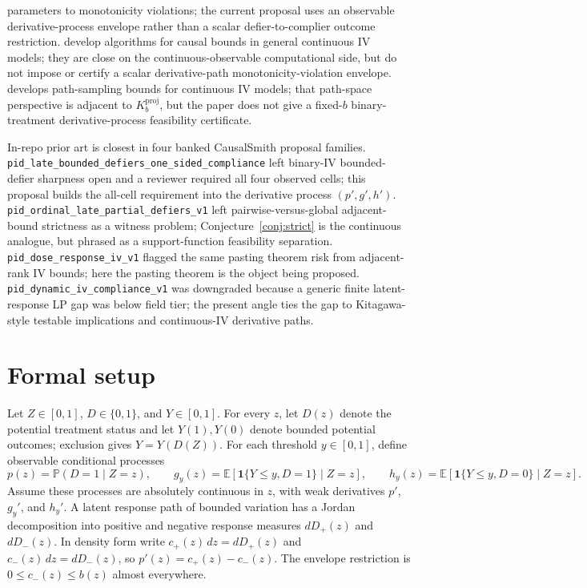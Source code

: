 \documentclass[11pt]{article}
\newcommand{\E}{\mathbb{E}}
\renewcommand{\Pr}{\mathbb{P}}
\newcommand{\one}{\mathbf{1}}
\theoremstyle{definition}
\theoremstyle{plain}
\theoremstyle{remark}
\begin{document}
parameters to monotonicity violations; the current proposal uses an observable derivative-process envelope rather than a scalar defier-to-complier outcome restriction.  \citet{KilbertusKusnerSilva2020} develop algorithms for causal bounds in general continuous IV models; they are close on the continuous-observable computational side, but do not impose or certify a scalar derivative-path monotonicity-violation envelope.  \citet{Gunsilius2019} develops path-sampling bounds for continuous IV models; that path-space perspective is adjacent to \(K_b^{\mathrm{proj}}\), but the paper does not give a fixed-\(b\) binary-treatment derivative-process feasibility certificate.

In-repo prior art is closest in four banked CausalSmith proposal families.  \texttt{pid\_late\_bounded\_defiers\_one\_sided\_compliance} left binary-IV bounded-defier sharpness open and a reviewer required all four observed cells; this proposal builds the all-cell requirement into the derivative process \((p',g',h')\).  \texttt{pid\_ordinal\_late\_partial\_defiers\_v1} left pairwise-versus-global adjacent-bound strictness as a witness problem; Conjecture~\ref{conj:strict} is the continuous analogue, but phrased as a support-function feasibility separation.  \texttt{pid\_dose\_response\_iv\_v1} flagged the same pasting theorem risk from adjacent-rank IV bounds; here the pasting theorem is the object being proposed.  \texttt{pid\_dynamic\_iv\_compliance\_v1} was downgraded because a generic finite latent-response LP gap was below field tier; the present angle ties the gap to Kitagawa-style testable implications and continuous-IV derivative paths.

\section{Formal setup}
Let \(Z\in[0,1]\), \(D\in\{0,1\}\), and \(Y\in[0,1]\).  For every \(z\), let \(D(z)\) denote the potential treatment status and let \(Y(1),Y(0)\) denote bounded potential outcomes; exclusion gives \(Y=Y(D(Z))\).  For each threshold \(y\in[0,1]\), define observable conditional processes
\[
p(z)=\Pr(D=1\mid Z=z),\qquad
g_y(z)=\E[\one\{Y\le y,D=1\}\mid Z=z],\qquad
h_y(z)=\E[\one\{Y\le y,D=0\}\mid Z=z].
\]
Assume these processes are absolutely continuous in \(z\), with weak derivatives \(p'\), \(g_y'\), and \(h_y'\).  A latent response path of bounded variation has a Jordan decomposition into positive and negative response measures \(dD_+(z)\) and \(dD_-(z)\).  In density form write \(c_+(z)\,dz=dD_+(z)\) and \(c_-(z)\,dz=dD_-(z)\), so \(p'(z)=c_+(z)-c_-(z)\).  The envelope restriction is \(0\le c_-(z)\le b(z)\) almost everywhere.
\end{document}

